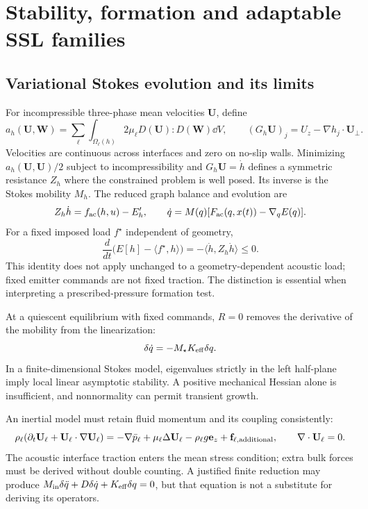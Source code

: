 \section{Stability, formation and adaptable SSL families}
\subsection{Variational Stokes evolution and its limits}
For incompressible three-phase mean velocities $\mathbf U$, define
\begin{equation}\label{eq:dissipation}
 a_h(\mathbf U,\mathbf W)=\sum_\ell\int_{\Omega_\ell(h)}
 2\mu_\ell D(\mathbf U):D(\mathbf W)\dd V,\qquad
 (G_h\mathbf U)_j=U_z-\nabla h_j\cdot\mathbf U_\perp.
\end{equation}
Velocities are continuous across interfaces and zero on no-slip walls.
Minimizing $a_h(\mathbf U,\mathbf U)/2$ subject to incompressibility and
$G_h\mathbf U=\dot h$ defines a symmetric resistance $Z_h$ where the
constrained problem is well posed. Its inverse is the Stokes mobility $M_h$.
The reduced graph balance and evolution are
\begin{equation}\label{eq:stokes-flow}
 Z_h\dot h=f_{\rm ac}(h,u)-E'_h,\qquad
 \dot q=M(q)[F_{\rm ac}(q,x(t))-\nabla_qE(q)].
\end{equation}
For a fixed imposed load $f^\star$ independent of geometry,
\begin{equation}
 \frac{d}{dt}\big(E[h]-\langle f^\star,h\rangle\big)
 =-\langle\dot h,Z_h\dot h\rangle\le0.\label{eq:fixed-load-energy}
\end{equation}
This identity does not apply unchanged to a geometry-dependent acoustic load;
fixed emitter commands are not fixed traction. The distinction is essential
when interpreting a prescribed-pressure formation test.

At a quiescent equilibrium with fixed commands, $R=0$ removes the derivative
of the mobility from the linearization:
\begin{equation}\label{eq:stokes-stability}
 \delta\dot q=-M_\star K_{\rm eff}\delta q.
\end{equation}
In a finite-dimensional Stokes model, eigenvalues strictly in the left
half-plane imply local linear asymptotic stability. A positive mechanical
Hessian alone is insufficient, and nonnormality can permit transient growth.

An inertial model must retain fluid momentum and its coupling consistently:
\begin{equation}\label{eq:mean-momentum}
 \rho_\ell(\partial_t\mathbf U_\ell+\mathbf U_\ell\cdot\nabla\mathbf U_\ell)
 =-\nabla\bar p_\ell+\mu_\ell\Delta\mathbf U_\ell
 -\rho_\ell g\mathbf e_z+\mathbf f_{\ell,\rm additional},
 \qquad\nabla\cdot\mathbf U_\ell=0.
\end{equation}
The acoustic interface traction enters the mean stress condition; extra bulk
forces must be derived without double counting. A justified finite reduction
may produce $M_{\rm in}\delta\ddot q+D\delta\dot q+K_{\rm eff}\delta q=0$,
but that equation is not a substitute for deriving its operators.

